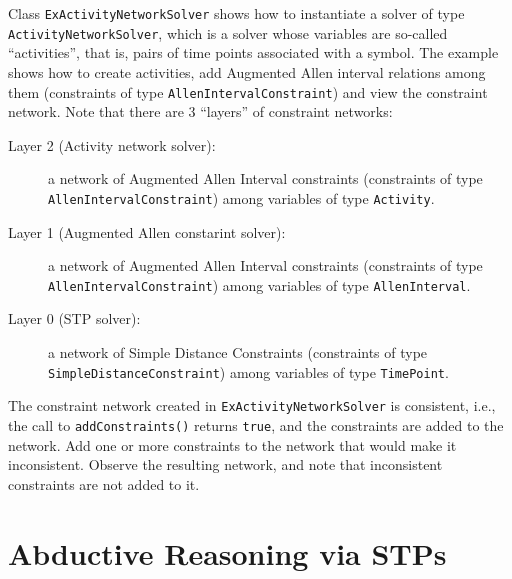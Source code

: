 \documentclass[a4paper]{article}
\begin{document}
Class {\tt ExActivityNetworkSolver} shows how to instantiate a solver of type {\tt ActivityNetworkSolver}, which is a solver whose variables are so-called ``activities'', that is, pairs of time points associated with a symbol.  The example shows how to create activities, add Augmented Allen interval relations among them (constraints of type {\tt AllenIntervalConstraint}) and view the constraint network.  Note that there are 3 ``layers'' of constraint networks:
\begin{description}
\item[Layer 2 (Activity network solver):] a network of Augmented Allen Interval constraints (constraints of type {\tt AllenIntervalConstraint}) among variables of type {\tt Activity}.
\item[Layer 1 (Augmented Allen constarint solver):] a network of Augmented Allen Interval constraints (constraints of type {\tt AllenIntervalConstraint}) among variables of type {\tt AllenInterval}.
\item[Layer 0 (STP solver):] a network of Simple Distance Constraints (constraints of type {\tt SimpleDistanceConstraint}) among variables of type {\tt TimePoint}.
\end{description}

{\ex{}\label{ex:ex8}
The constraint network created in {\tt ExActivityNetworkSolver} is consistent, i.e., the call to {\tt addConstraints()} returns {\tt true}, and the constraints are added to the network.  Add one or more constraints to the network that would make it inconsistent.  Observe the resulting network, and note that inconsistent constraints are not added to it.
\vspace{0.1cm}}


\section{Abductive Reasoning via STPs}
\end{document}
